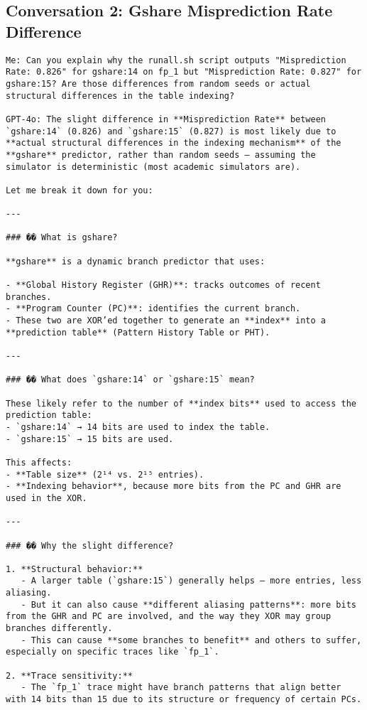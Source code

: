 \documentclass[11pt]{article}
\begin{document}
\subsection{Conversation 2: Gshare Misprediction Rate Difference}
\begin{verbatim}
Me: Can you explain why the runall.sh script outputs "Misprediction Rate: 0.826" for gshare:14 on fp_1 but "Misprediction Rate: 0.827" for gshare:15? Are those differences from random seeds or actual structural differences in the table indexing?

GPT-4o: The slight difference in **Misprediction Rate** between `gshare:14` (0.826) and `gshare:15` (0.827) is most likely due to **actual structural differences in the indexing mechanism** of the **gshare** predictor, rather than random seeds — assuming the simulator is deterministic (most academic simulators are).

Let me break it down for you:

---

### �� What is gshare?

**gshare** is a dynamic branch predictor that uses:

- **Global History Register (GHR)**: tracks outcomes of recent branches.
- **Program Counter (PC)**: identifies the current branch.
- These two are XOR’ed together to generate an **index** into a **prediction table** (Pattern History Table or PHT).

---

### �� What does `gshare:14` or `gshare:15` mean?

These likely refer to the number of **index bits** used to access the prediction table:
- `gshare:14` → 14 bits are used to index the table.
- `gshare:15` → 15 bits are used.

This affects:
- **Table size** (2¹⁴ vs. 2¹⁵ entries).
- **Indexing behavior**, because more bits from the PC and GHR are used in the XOR.

---

### �� Why the slight difference?

1. **Structural behavior:**
   - A larger table (`gshare:15`) generally helps — more entries, less aliasing.
   - But it can also cause **different aliasing patterns**: more bits from the GHR and PC are involved, and the way they XOR may group branches differently.
   - This can cause **some branches to benefit** and others to suffer, especially on specific traces like `fp_1`.

2. **Trace sensitivity:**
   - The `fp_1` trace might have branch patterns that align better with 14 bits than 15 due to its structure or frequency of certain PCs.


\end{verbatim}
\end{document}

